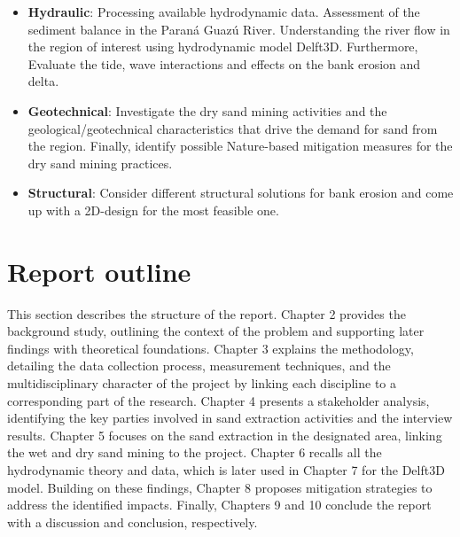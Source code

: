 \begin{itemize}
    \item \textbf{Hydraulic}: 
    Processing available hydrodynamic data.
    Assessment of the sediment balance in the Paraná Guazú River.
    Understanding the river flow in the region of interest using hydrodynamic model Delft3D. Furthermore, Evaluate the tide, wave interactions and effects on the bank erosion and delta. 
    
    \item \textbf{Geotechnical}: 
    Investigate the dry sand mining activities and the geological/geotechnical characteristics that drive the demand for sand from the region. Finally, identify possible Nature-based mitigation measures for the dry sand mining practices.
    \item \textbf{Structural}: Consider different structural solutions for bank erosion and come up with a 2D-design for the most feasible one.
\end{itemize}

\section{Report outline}
\label{section: report outline}
This section describes the structure of the report. Chapter 2 provides the background study, outlining the context of the problem and supporting later findings with theoretical foundations. Chapter 3 explains the methodology, detailing the data collection process, measurement techniques, and the multidisciplinary character of the project by linking each discipline to a corresponding part of the research. Chapter 4 presents a stakeholder analysis, identifying the key parties involved in sand extraction activities and the interview results. Chapter 5 focuses on the sand extraction in the designated area, linking the wet and dry sand mining to the project. Chapter 6 recalls all the hydrodynamic theory and data, which is later used in Chapter 7 for the Delft3D model. Building on these findings, Chapter 8 proposes mitigation strategies to address the identified impacts. Finally, Chapters 9 and 10 conclude the report with a discussion and conclusion, respectively.